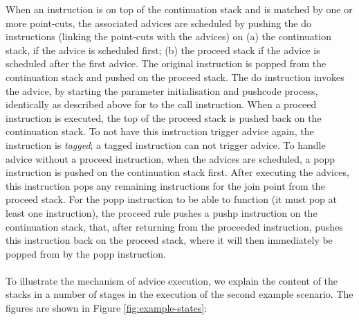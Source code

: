 When an instruction is on top of the continuation stack and is matched by one or more point-cuts, the associated advices are scheduled by pushing the {\sc do} instructions (linking the point-cuts with the advices) on (a) the continuation stack, if the advice is scheduled first; (b) the proceed stack if the advice is scheduled after the first advice. The original instruction is popped from the continuation stack and pushed on the proceed stack. The {\sc do} instruction invokes the advice, by starting the parameter initialisation and pushcode process, identically as described above for to the {\sc call} instruction. When a {\sc proceed} instruction is executed, the top of the proceed stack is pushed back on the continuation stack. To not have this instruction trigger advice again, the instruction is \emph{tagged}; a tagged instruction can not trigger advice. To handle advice without a {\sc proceed} instruction, when the advices are scheduled, a {\sc popp} instruction is pushed on the continuation stack first. After executing the advices, this instruction pops any remaining instructions for the join point from the proceed stack. For the {\sc popp} instruction to be able to function (it must pop at least one instruction), the proceed rule pushes a {\sc pushp} instruction on the continuation stack, that, after returning from the proceeded instruction, pushes this instruction back on the proceed stack, where it will then immediately be popped from by the {\sc popp} instruction.\\
\\
To illustrate the mechanism of advice execution, we explain the content of the stacks in a number of stages in the execution of the second example scenario. The figures are shown in Figure \ref{fig:example-states}: 
